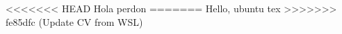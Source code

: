 \documentclass{elias-cv}
\begin{document}
<<<<<<< HEAD
Hola  perdon
=======
Hello, ubuntu tex
>>>>>>> fe85dfc (Update CV from WSL)
\end{document}
